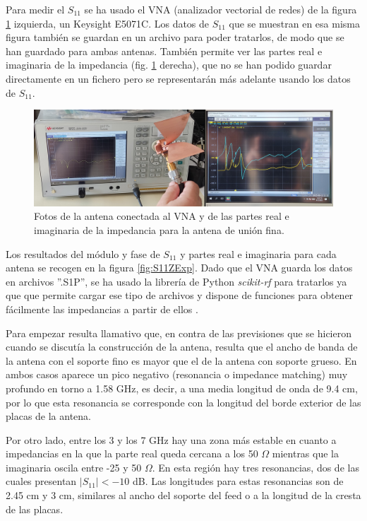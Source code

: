 \documentclass[11pt,a4paper,twoside,pdf]{article}
\numberwithin{equation}{section}
\begin{document}
Para medir el $S_{11}$ se ha usado el VNA (analizador vectorial de redes) de la figura \ref{fig:VNA} izquierda, un Keysight E5071C. Los datos de $S_{11}$ que se muestran en esa misma figura también se guardan en un archivo para poder tratarlos, de modo que se han guardado para ambas antenas. También permite ver las partes real e imaginaria de la impedancia (fig. \ref{fig:VNA} derecha), que no se han podido guardar directamente en un fichero pero se representarán más adelante usando los datos de $S_{11}$.
\begin{figure}[!h]
    \centering
    \includegraphics[width=\linewidth]{img/medidasExp/VNA.jpg}
    \vspace{-0.5cm}
    \caption{Fotos de la antena conectada al VNA y de las partes real e imaginaria de la impedancia para la antena de unión fina.}
    \label{fig:VNA}
\end{figure}

Los resultados del módulo y fase de $S_{11}$ y partes real e imaginaria para cada antena se recogen en la figura \ref{fig:S11ZExp}. Dado que el VNA guarda los datos en archivos ''.S1P'', se ha usado la librería de Python \textit{scikit-rf} para tratarlos ya que que permite cargar ese tipo de archivos y dispone de funciones para obtener fácilmente las impedancias a partir de ellos \cite{skrf}. 

Para empezar resulta llamativo que, en contra de las previsiones que se hicieron cuando se discutía la construcción de la antena, resulta que el ancho de banda de la antena con el soporte fino es mayor que el de la antena con soporte grueso. En ambos casos aparece un pico negativo (resonancia o impedance matching) muy profundo en torno a 1.58 GHz, es decir, a una media longitud de onda de 9.4 cm, por lo que esta resonancia se corresponde con la longitud del borde exterior de las placas de la antena.

Por otro lado, entre los 3 y los 7 GHz hay una zona más estable en cuanto a impedancias en la que la parte real queda cercana a los 50 $\Omega$ mientras que la imaginaria oscila entre -25 y 50 $\Omega$. En esta región hay tres resonancias, dos de las cuales presentan $|S_{11}|<-10$ dB. Las longitudes para estas resonancias son de 2.45 cm y 3 cm, similares al ancho del soporte del feed o a la longitud de la cresta de las placas. 
\end{document}
